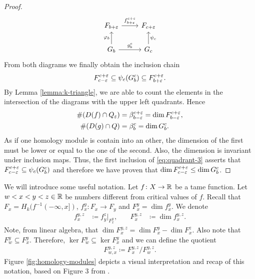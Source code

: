 \begin{proof}
\begin{equation}
\begin{tikzcd}
        F_{b+\e} \arrow[r, "f_{b+\e}^{c+\e}"]
        & F_{c+\e} \\
        G_b \arrow[r, "g_b^c"] \arrow[u, "\varphi_{b}"]
        & G_c \arrow[u, "\psi_c"']        
    \end{tikzcd}
    \end{equation}
    From both diagrams we finally obtain the inclusion chain
    \begin{align}  \label{eq:quadrant-3}
        F_{c-\varepsilon}^{c+\varepsilon} \subseteq \psi_c (G_b^c) \subseteq F_{b+\varepsilon}^{c+\varepsilon}.
    \end{align}
    By Lemma \ref{lemma:k-triangle}, we are able to count the elements in the intersection of the diagrams with the upper left quadrants. Hence
    \begin{align}
        \#(D(f) \cap Q_\varepsilon) &= \beta_{b-\varepsilon}^{c+\varepsilon} = \dim F_{b-\varepsilon}^{c+\varepsilon}, \\
        \#(D(g) \cap Q) &= \beta_b^c = \dim G_b^c.
    \end{align}
    As if one homology module is contain into an other, the dimension of the first must be lower or equal to the one of the second. Also, the dimension is invariant under inclusion maps. Thus, the first inclusion of \eqref{eq:quadrant-3} asserts that $ F_{c-\varepsilon}^{c+\varepsilon} \subseteq \psi_c (G_b^c) $ and therefore we have proven that $ \dim F_{c-\varepsilon}^{c+\varepsilon} \leq  \dim G_b^c $.
\end{proof} 

We will introduce some useful notation. Let $ f\colon X \to \mathbb R $ be a tame function. Let $ w < x < y < z \in \mathbb R $ be numbers different from critical values of $ f $. Recall that $ F_x = H_k(f^{-1}(-\infty, x]) $, $ f_x^y \colon F_x \to F_y $ and $ F_x^y = \dim f_x^y $. We denote
\begin{align}
    f_x^{y, z} &\coloneq f_y^z \rvert_{F_x^y},
    \quad &
    F_x^{y, z} &\coloneq \dim f_x^{y, z}.
\end{align}
Note, from linear algebra, that $ \dim F_x^{y,z} = \dim F_x^y - \dim F_x^z $. Also note that $ F_w^y \subseteq F_x^y $. Therefore, $ \ker F_w^y \subseteq \ker F_x^y $ and we can define the quotient
\begin{align}
    F_{w,x}^{y,z} \coloneq F_x^{y,z} / F_w^{y,z}.
\end{align}
Figure \ref{fig:homology-modules} depicts a visual interpretation and recap of this notation, based on Figure 3 from \cite{Edelsbrunner}.

\begin{figure}[H]
    
\end{figure}

